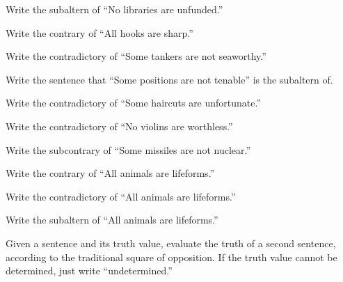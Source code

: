 \begin{exercises}
\item Write the subaltern of ``No libraries are unfunded.'' 
\item Write the contrary of ``All hooks are sharp.''
\item Write the contradictory of ``Some tankers are not seaworthy.'' 
\item Write the sentence that ``Some positions are not tenable'' is the subaltern of.  
\item Write the contradictory of ``Some haircuts are unfortunate.'' 
\item Write the contradictory of ``No violins are worthless.'' 
\item Write the subcontrary of ``Some missiles are not nuclear.'' 
\item Write the contrary of ``All animals are lifeforms.'' 
\item Write the contradictory of ``All animals are lifeforms.'' 
\item Write the subaltern of ``All animals are lifeforms.'' 
\end{exercises}

\noindent \problempart Given a sentence and its truth value, evaluate the truth of a second sentence, according to the traditional square of opposition. If the truth value cannot be determined, just write ``undetermined.''

